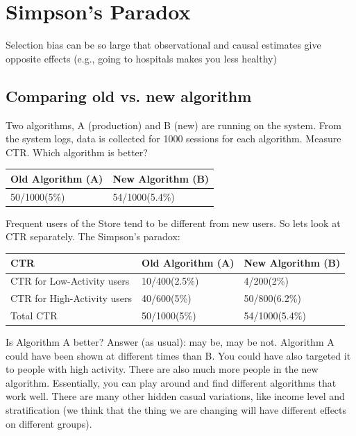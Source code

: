 
\section{Simpson's Paradox}
Selection bias can be so large that observational and causal estimates give opposite effects (e.g., going to hospitals makes you less healthy)
\subsection{Comparing old vs. new algorithm}
Two algorithms, A (production) and B (new) are running on the system. From the system logs, data is collected for 1000 sessions for each algorithm. Measure CTR. Which algorithm is better?
  \begin{center}
      \begin{tabular}{ | l | l |}
      \hline
      Old Algorithm (A) & New Algorithm (B)\\ \hline
      50/1000(5\%) & 54/1000(5.4\%) \\ \hline
      \end{tabular}
  \end{center}
Frequent users of the Store tend to be different from new users. So lets look at CTR separately. The Simpson's paradox: 
  \begin{center}
      \begin{tabular}{ | l | l |l |}
      \hline
      CTR & Old Algorithm (A) & New Algorithm (B)\\ \hline
      CTR for Low-Activity users & 10/400(2.5\%) & 4/200(2\%) \\ \hline
      CTR for High-Activity users & 40/600(5\%) & 50/800(6.2\%) \\ \hline
      Total CTR & 50/1000(5\%) & 54/1000(5.4\%) \\ \hline
      \end{tabular}
  \end{center}
Is Algorithm A better? Answer (as usual): may be, may be not. Algorithm A could have been shown at different times than B. You could have also targeted it to people with high activity. There are also much more people in the new algorithm. Essentially, you can play around and find different algorithms that work well. There are many other hidden casual variations, like income level and stratification (we think that the thing we are changing will have different effects on different groups).

